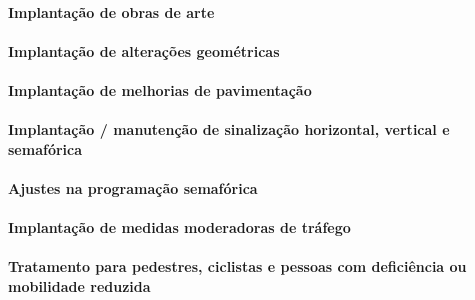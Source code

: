 \documentclass[]{article}
\let\oldparagraph\paragraph
\renewcommand{\paragraph}[1]{\oldparagraph{#1}\mbox{}}
\begin{document}
\hypertarget{implantauxe7uxe3o-de-obras-de-arte}{%
\paragraph{Implantação de obras de
arte}\label{implantauxe7uxe3o-de-obras-de-arte}}

\hypertarget{implantauxe7uxe3o-de-alterauxe7uxf5es-geomuxe9tricas}{%
\paragraph{Implantação de alterações
geométricas}\label{implantauxe7uxe3o-de-alterauxe7uxf5es-geomuxe9tricas}}

\hypertarget{implantauxe7uxe3o-de-melhorias-de-pavimentauxe7uxe3o}{%
\paragraph{Implantação de melhorias de
pavimentação}\label{implantauxe7uxe3o-de-melhorias-de-pavimentauxe7uxe3o}}

\hypertarget{implantauxe7uxe3o-manutenuxe7uxe3o-de-sinalizauxe7uxe3o-horizontal-vertical-e-semafuxf3rica}{%
\paragraph{Implantação / manutenção de sinalização horizontal, vertical
e
semafórica}\label{implantauxe7uxe3o-manutenuxe7uxe3o-de-sinalizauxe7uxe3o-horizontal-vertical-e-semafuxf3rica}}

\hypertarget{ajustes-na-programauxe7uxe3o-semafuxf3rica}{%
\paragraph{Ajustes na programação
semafórica}\label{ajustes-na-programauxe7uxe3o-semafuxf3rica}}

\hypertarget{implantauxe7uxe3o-de-medidas-moderadoras-de-truxe1fego}{%
\paragraph{Implantação de medidas moderadoras de
tráfego}\label{implantauxe7uxe3o-de-medidas-moderadoras-de-truxe1fego}}

\hypertarget{tratamento-para-pedestres-ciclistas-e-pessoas-com-deficiuxeancia-ou-mobilidade-reduzida}{%
\paragraph{Tratamento para pedestres, ciclistas e pessoas com
deficiência ou mobilidade
reduzida}\label{tratamento-para-pedestres-ciclistas-e-pessoas-com-deficiuxeancia-ou-mobilidade-reduzida}}
\end{document}
